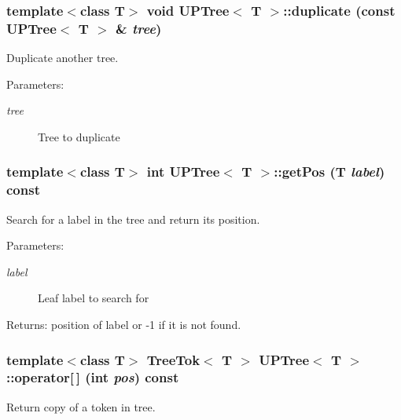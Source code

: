 \subsubsection{\setlength{\rightskip}{0pt plus 5cm}template$<$class T$>$ void {\bf UPTree}$<$ T $>$::duplicate (const {\bf UPTree}$<$ T $>$ \& {\em tree})\hspace{0.3cm}{\tt  [inline]}}\label{structUPTree_a2}


Duplicate another tree. 

\begin{Desc}
\item[Parameters:]
\begin{description}
\item[{\em tree}]Tree to duplicate \end{description}
\end{Desc}
\subsubsection{\setlength{\rightskip}{0pt plus 5cm}template$<$class T$>$ int {\bf UPTree}$<$ T $>$::get\-Pos (T {\em label}) const\hspace{0.3cm}{\tt  [inline]}}\label{structUPTree_a5}


Search for a label in the tree and return its position. 

\begin{Desc}
\item[Parameters:]
\begin{description}
\item[{\em label}]Leaf label to search for \end{description}
\end{Desc}
\begin{Desc}
\item[Returns:]position of label or -1 if it is not found. \end{Desc}
\subsubsection{\setlength{\rightskip}{0pt plus 5cm}template$<$class T$>$ {\bf Tree\-Tok}$<$ T $>$ {\bf UPTree}$<$ T $>$::operator[$\,$] (int {\em pos}) const\hspace{0.3cm}{\tt  [inline]}}\label{structUPTree_a1}


Return copy of a token in tree. 

